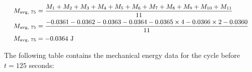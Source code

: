 \documentclass[titlepage]{article}
\begin{document}
            \begin{equation}
                \small
                \begin{aligned}
                    M_{\text{avg, 75}} &= \frac{M_1 + M_2 + M_3 + M_4 + M_5 + M_6 + M_7 + M_8 + M_9 + M_{10} + M_{11}}{11} \\
                    M_{\text{avg, 75}} &= \frac{-0.0361 -0.0362 -0.0363 -0.0364 -0.0365 \times 4 -0.0366 \times 2 -0.0360}{11} \\ %
                    M_{\text{avg, 75}} &= -0.0364 \text{ J} \\
                \end{aligned}\label{eq:average-mechanical-energy-cycle-at-75-seconds}
            \end{equation}
            
            The following table contains the mechanical energy data for the cycle before $t=125$ seconds:
            
\end{document}

